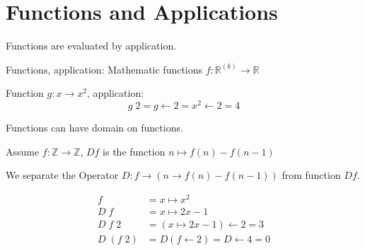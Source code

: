 \section{Functions and Applications}

Functions are evaluated by application.

Functions, application: Mathematic functions
\(f: \mathbb{R}^{(k)} \rightarrow \mathbb{R}\)

\begin{example}
Function \(g: x \rightarrow x^2\), application:
$$g\;2 = g \leftarrow 2 = x^2 \leftarrow 2 = 4$$
\end{example}


Functions can have domain on functions.

\begin{example}


Assume \(f: \mathbb{Z} \rightarrow \mathbb{Z}\), \(Df\) is the function \(n \mapsto f(n)-f(n-1)\)

We separate the Operator \(D: f \rightarrow (n \rightarrow f(n) - f(n-1))\) from function $Df$.

\begin{align*}
f &= x \mapsto x^2 \\
D\;f &= x \mapsto 2x -1 \\
D\;f\;2 &= (x \mapsto 2x-1) \leftarrow 2 = 3 \\
D\;(f\;2) &= D(f \leftarrow 2) = D \leftarrow 4 = 0
\end{align*}

\end{example}